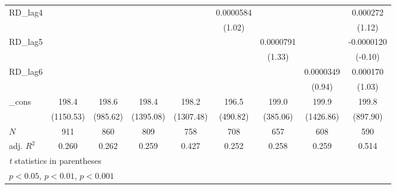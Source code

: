 {\begin{tabular}{l*{8}{c}}
\addlinespace
RD\_lag4     &                     &                     &                     &                     &   0.0000584         &                     &                     &    0.000272         \\
            &                     &                     &                     &                     &      (1.02)         &                     &                     &      (1.12)         \\
\addlinespace
RD\_lag5     &                     &                     &                     &                     &                     &   0.0000791         &                     &  -0.0000120         \\
            &                     &                     &                     &                     &                     &      (1.33)         &                     &     (-0.10)         \\
\addlinespace
RD\_lag6     &                     &                     &                     &                     &                     &                     &   0.0000349         &    0.000170         \\
            &                     &                     &                     &                     &                     &                     &      (0.94)         &      (1.03)         \\
\addlinespace
\_cons      &       198.4\sym{***}&       198.6\sym{***}&       198.4\sym{***}&       198.2\sym{***}&       196.5\sym{***}&       199.0\sym{***}&       199.9\sym{***}&       199.8\sym{***}\\
            &   (1150.53)         &    (985.62)         &   (1395.08)         &   (1307.48)         &    (490.82)         &    (385.06)         &   (1426.86)         &    (897.90)         \\
\midrule
\(N\)       &         911         &         860         &         809         &         758         &         708         &         657         &         608         &         590         \\
adj. \(R^{2}\)&       0.260         &       0.262         &       0.259         &       0.427         &       0.252         &       0.258         &       0.259         &       0.514         \\
\bottomrule
\multicolumn{9}{l}{\footnotesize \textit{t} statistics in parentheses}\\
\multicolumn{9}{l}{\footnotesize \sym{*} \(p<0.05\), \sym{**} \(p<0.01\), \sym{***} \(p<0.001\)}\\
\end{tabular}
}
